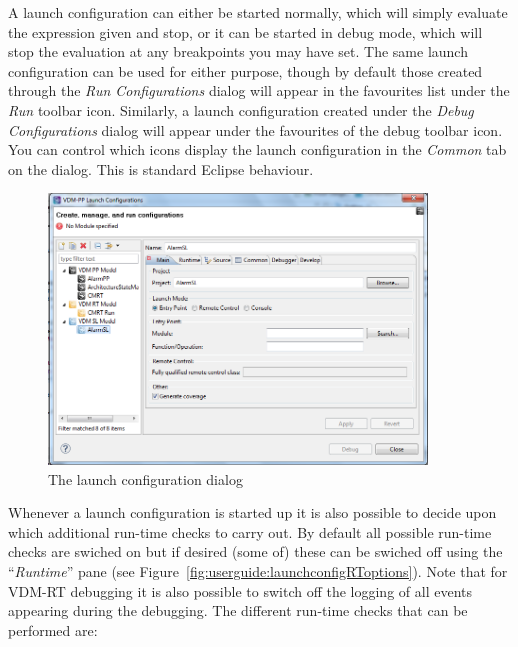 \documentclass{overturerepchap}
\begin{document}
A launch configuration can either be started normally, which will simply evaluate
the expression given and stop, or it can be started in debug mode, which will
stop the evaluation at any breakpoints you may have set. The same launch configuration
can be used for either purpose, though by default those created through the
\emph{Run Configurations} dialog will appear in the favourites list under the
\emph{Run} toolbar icon. Similarly, a launch configuration created under the
\emph{Debug Configurations} dialog will appear under the favourites of the
debug toolbar icon. You can control which icons display the launch configuration
in the \emph{Common} tab on the dialog. This is standard Eclipse behaviour.


\begin{figure}[htp]
\begin{center}
  \includegraphics[width=380px]{screenDumps/launchconfig}
  \caption{The launch configuration dialog}
  \label{fig:userguide:launchconfig}
\end{center}
\end{figure}

Whenever a launch configuration is started up it is also possible to
decide upon which additional run-time checks to carry out. By default
all possible run-time checks are swiched on but if desired (some of)
these can be swiched off using the ``\emph{Runtime}'' pane (see
Figure~\ref{fig:userguide:launchconfigRToptions}). Note that for
VDM-RT debugging it is also possible to switch off the logging of all
events appearing during the debugging. The different run-time checks
that can be performed are:
\end{document}
